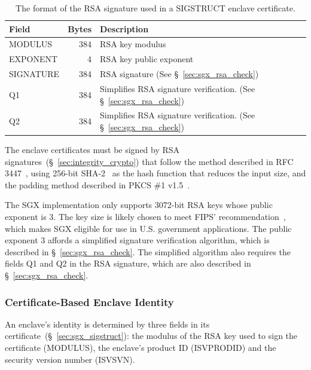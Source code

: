 \begin{table}[hbt]
  \centering
  \begin{tabularx}{\columnwidth}{| l | r | X |}
  \hline
  \textbf{Field} & \textbf{Bytes} & \textbf{Description} \\
  \hline
  MODULUS & 384 & RSA key modulus \\
  \hline
  EXPONENT & 4 & RSA key public exponent \\
  \hline
  SIGNATURE & 384 & RSA signature (See \S~\ref{sec:sgx_rsa_check}) \\
  \hline
  Q1 & 384 & Simplifies RSA signature verification.
             (See \S~\ref{sec:sgx_rsa_check}) \\
  \hline
  Q2 & 384 & Simplifies RSA signature verification.
             (See \S~\ref{sec:sgx_rsa_check}) \\
  \hline
  \end{tabularx}
  \caption{
    The format of the RSA signature used in a SIGSTRUCT enclave certificate.
  }
  \label{fig:sgx_sigstruct_rsa}
\end{table}

The enclave certificates must be signed by RSA
signatures~(\S~\ref{sec:integrity_crypto}) that follow the method described in
RFC 3447~\cite{jonsson2003pkcsv21}, using 256-bit SHA-2~\cite{fips2015shs} as
the hash function that reduces the input size, and the padding method described
in PKCS \#1 v1.5~\cite{kaliski1998pkcs1v15}.

The SGX implementation only supports 3072-bit RSA keys whose public exponent is
3. The key size is likely chosen to meet FIPS'
recommendation~\cite{fips2012keysize}, which makes SGX eligible for use in U.S.
government applications. The public exponent 3 affords a simplified signature
verification algorithm, which is described in \S~\ref{sec:sgx_rsa_check}. The
simplified algorithm also requires the fields Q1 and Q2 in the RSA signature,
which are also described in \S~\ref{sec:sgx_rsa_check}.


\subsubsection{Certificate-Based Enclave Identity}
\label{sec:sgx_certificate_identity}

An enclave's identity is determined by three fields in its
certificate~(\S~\ref{sec:sgx_sigstruct}): the modulus of the RSA key used to
sign the certificate (MODULUS), the enclave's product ID (ISVPRODID) and the
security version number (ISVSVN).

